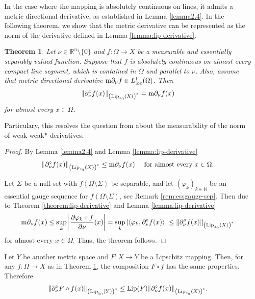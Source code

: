 \documentclass[reqno]{amsart}
\newtheorem{thm}{Theorem}[section]
\begin{document}
In the case where the mapping is absolutely continuous on lines, it admits a metric directional derivative, as established in Lemma \ref{lemma2.4}. In the following theorem, we show that the metric derivative can be represented as the norm of the derivative defined in Lemma \ref{lemma:lip-derivative}.

\begin{thm}\label{theorem:lip-derivative2}
Let $\nu\in \mathbb R^{n}\setminus\{0\}$ and $f:\Omega\to X$ be a measurable and essentially separably valued function.
Suppose that $f$ is absolutely continuous on almost every compact line segment, which is contained in $\Omega$
and parallel to $\nu$. 
Also, assume that metric directional derivative $\textnormal{m}\partial_\nu f\in L^1_{\operatorname{loc}}(\Omega)$.
Then
\begin{equation} 
\|\partial^\circ_\nu f(x)\|_{\left(\textnormal{Lip}_{z_0}(X)\right)^*} = \textnormal{m}\partial_\nu f(x) 
\end{equation}
for almost every  $x\in\Omega$.
\end{thm}
Particulary, this resolves the question from \cite[Subsection 3.4]{CE:23}
about the measurability of the norm of weak weak* derivatives.
\begin{proof}
By Lemma \ref{lemma2.4} and Lemma \ref{lemma:lip-derivative}
\begin{equation*} 
\|\partial^\circ_\nu f(x)\|_{\left(\textnormal{Lip}_{z_0}(X)\right)^*} \leq \textnormal{m}\partial_\nu f(x) 
\quad \text{ for almost every } x\in\Omega.
\end{equation*}

Let $\Sigma$ be a null-set with $f(\Omega\setminus\Sigma)$ be separable, and
 let $(\varphi_k)_{k\in\mathbb N}$ be an essential gauge sequence for $f(\Omega\setminus\Sigma)$, see Remark \ref{rem:essgauge-sep}. 
 Then due to Theorem \ref{theorem:lip-derivative} and Lemma \ref{lemma:lip-derivative}
\[
\textnormal{m}\partial_\nu f(x) \leq \sup_{k} \bigg| \frac{\partial \varphi_{k}\circ f}{\partial\nu}(x)\bigg|
= \sup_{k} |\langle \varphi_k, \partial^\circ_\nu f(x) \rangle |
\leq \|\partial^\circ_\nu f(x)\|_{\left(\textnormal{Lip}_{z_0}(X)\right)^*}
\]
for almost every  $x\in\Omega$.
Thus, the theorem follows.
\end{proof}

Let $Y$ be another metric space and $F:X\to Y$ be a Lipschitz mapping.
Then, for any $f:\Omega\to X$ as in Theorem \ref{theorem:lip-derivative2}, the composition $F\circ f$ has the same properties.
Therefore 
\begin{equation}\label{eq:der-comp}
\|\partial^\circ_\nu F\circ f(x)\|_{\left(\textnormal{Lip}_{y_0}(Y)\right)^*}
\leq \operatorname{Lip}(F)\|\partial^\circ_\nu f(x)\|_{\left(\textnormal{Lip}_{z_0}(X)\right)^*}.
\end{equation}
\end{document}

